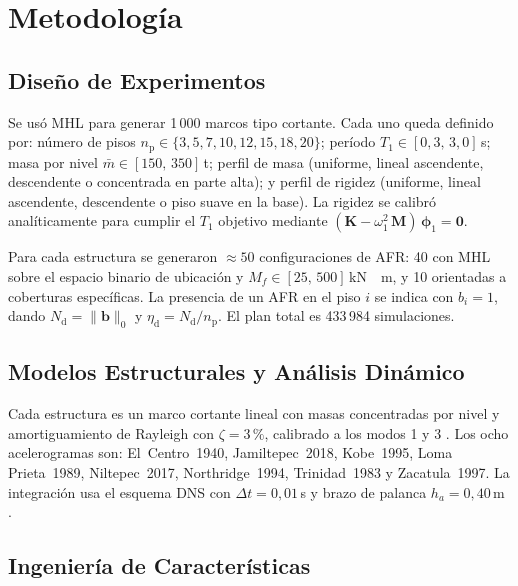 \documentclass[preprint,12pt,authoryear]{elsarticle}
\newcommand{\nd}{N_{\mathrm{d}}}
\newcommand{\np}{n_{\mathrm{p}}}
\newcommand{\etad}{\eta_{\mathrm{d}}}
\newcommand{\Mf}{M_{\!f}}
\newcommand{\ha}{h_a}
\newcommand{\KM}{\,\si{kN{\cdot}m}}
\begin{document}
\section{Metodología}
\label{sec:method}

\subsection{Diseño de Experimentos}
\label{sec:method:doe}

Se usó MHL \citep{McKay1979} para generar 1\,000 marcos tipo cortante. Cada
uno queda definido por: número de pisos $\np \in \{3, 5, 7, 10, 12, 15, 18,
20\}$; período $T_1 \in [0{,}3,\,3{,}0]$\,s; masa por nivel
$\bar{m} \in [150,\,350]$\,t; perfil de masa (uniforme, lineal ascendente,
descendente o concentrada en parte alta); y perfil de rigidez (uniforme,
lineal ascendente, descendente o piso suave en la base). La rigidez se
calibró analíticamente para cumplir el $T_1$ objetivo mediante
$(\bm{K} - \omega_1^2\,\bm{M})\,\bm{\phi}_1 = \bm{0}$.

Para cada estructura se generaron $\approx 50$ configuraciones de AFR: 40
con MHL sobre el espacio binario de ubicación y
$\Mf \in [25,\,500]$\KM, y 10 orientadas a coberturas específicas. La
presencia de un AFR en el piso $i$ se indica con $b_i = 1$, dando
$\nd = \|\bm{b}\|_0$ y $\etad = \nd/\np$. El plan total es
433\,984 simulaciones.

\subsection{Modelos Estructurales y Análisis Dinámico}
\label{sec:method:modelo}

Cada estructura es un marco cortante lineal con masas concentradas por nivel
y amortiguamiento de Rayleigh con $\zeta = 3\,\text{\%}$, calibrado a los
modos 1 y 3 \citep{chopra_dynamics_2015}. Los ocho acelerogramas son:
El~Centro~1940, Jamiltepec~2018, Kobe~1995, Loma Prieta~1989,
Niltepec~2017, Northridge~1994, Trinidad~1983 y Zacatula~1997. La
integración usa el esquema DNS con $\Delta t = 0{,}01$\,s y brazo de palanca
$\ha = 0{,}40$\,m \citep{Mualla2002, Jarrahi2020jbe}.

\subsection{Ingeniería de Características}
\label{sec:method:features}
\end{document}
